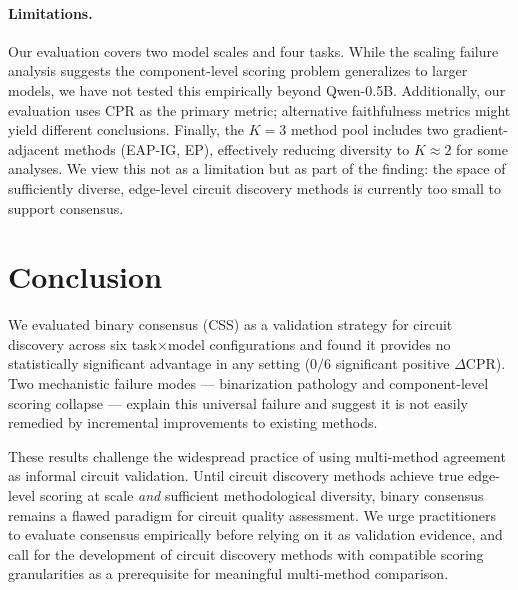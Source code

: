 \documentclass[11pt,a4paper]{article}
\begin{document}
\paragraph{Limitations.}
Our evaluation covers two model scales and four tasks. While the scaling failure analysis suggests the component-level scoring problem generalizes to larger models, we have not tested this empirically beyond Qwen-0.5B. Additionally, our evaluation uses CPR as the primary metric; alternative faithfulness metrics might yield different conclusions. Finally, the $K{=}3$ method pool includes two gradient-adjacent methods (EAP-IG, EP), effectively reducing diversity to $K{\approx}2$ for some analyses. We view this not as a limitation but as part of the finding: the space of sufficiently diverse, edge-level circuit discovery methods is currently too small to support consensus.

\section{Conclusion}

We evaluated binary consensus (CSS) as a validation strategy for circuit discovery across six task$\times$model configurations and found it provides no statistically significant advantage in any setting ($0/6$ significant positive $\Delta$CPR). Two mechanistic failure modes --- binarization pathology and component-level scoring collapse --- explain this universal failure and suggest it is not easily remedied by incremental improvements to existing methods.

These results challenge the widespread practice of using multi-method agreement as informal circuit validation. Until circuit discovery methods achieve true edge-level scoring at scale \emph{and} sufficient methodological diversity, binary consensus remains a flawed paradigm for circuit quality assessment. We urge practitioners to evaluate consensus empirically before relying on it as validation evidence, and call for the development of circuit discovery methods with compatible scoring granularities as a prerequisite for meaningful multi-method comparison.


\end{document}
